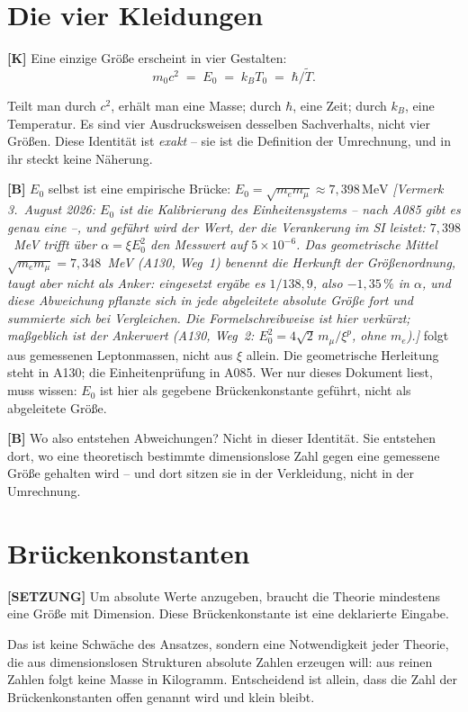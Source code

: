 \section{Die vier Kleidungen}

\textbf{[K]} Eine einzige Größe erscheint in vier Gestalten:
\[
  m_0 c^2 \;=\; E_0 \;=\; k_B T_0 \;=\; \hbar/\tilde T .
\]

Teilt man durch $c^2$, erhält man eine Masse; durch $\hbar$, eine Zeit; durch
$k_B$, eine Temperatur. Es sind vier Ausdrucksweisen desselben Sachverhalts,
nicht vier Größen. Diese Identität ist \emph{exakt} -- sie ist die Definition
der Umrechnung, und in ihr steckt keine Näherung.

\textbf{[B]} $E_0$ selbst ist eine empirische Brücke: $E_0=\sqrt{m_em_\mu}
\approx7{,}398\,\text{MeV}$ \emph{[Vermerk 3.~August 2026: $E_0$ ist die Kalibrierung des Einheitensystems -- nach A085 gibt es genau eine --, und geführt wird der Wert, der die Verankerung im SI leistet: $7{,}398$~MeV trifft über $\alpha = \xi E_0^2$ den Messwert auf $5\times10^{-6}$. Das geometrische Mittel $\sqrt{m_em_\mu} = 7{,}348$~MeV (A130, Weg~1) benennt die Herkunft der Größenordnung, taugt aber nicht als Anker: eingesetzt ergäbe es $1/138{,}9$, also $-1{,}35\,\%$ in $\alpha$, und diese Abweichung pflanzte sich in jede abgeleitete absolute Größe fort und summierte sich bei Vergleichen. Die Formelschreibweise ist hier verkürzt; maßgeblich ist der Ankerwert (A130, Weg~2: $E_0^2 = 4\sqrt2\,m_\mu/\xi^{p}$, ohne $m_e$).]} folgt aus gemessenen Leptonmassen, nicht aus $\xi$
allein. Die geometrische Herleitung steht in A130; die Einheitenprüfung in A085.
Wer nur dieses Dokument liest, muss wissen: $E_0$ ist hier als gegebene
Brückenkonstante geführt, nicht als abgeleitete Größe.

\textbf{[B]} Wo also entstehen Abweichungen? Nicht in dieser Identität. Sie
entstehen dort, wo eine theoretisch bestimmte dimensionslose Zahl gegen eine
gemessene Größe gehalten wird -- und dort sitzen sie in der Verkleidung, nicht
in der Umrechnung.

\section{Brückenkonstanten}

\textbf{[SETZUNG]} Um absolute Werte anzugeben, braucht die Theorie mindestens
eine Größe mit Dimension. Diese Brückenkonstante ist eine deklarierte Eingabe.

Das ist keine Schwäche des Ansatzes, sondern eine Notwendigkeit jeder Theorie,
die aus dimensionslosen Strukturen absolute Zahlen erzeugen will: aus reinen
Zahlen folgt keine Masse in Kilogramm. Entscheidend ist allein, dass die Zahl
der Brückenkonstanten offen genannt wird und klein bleibt.

